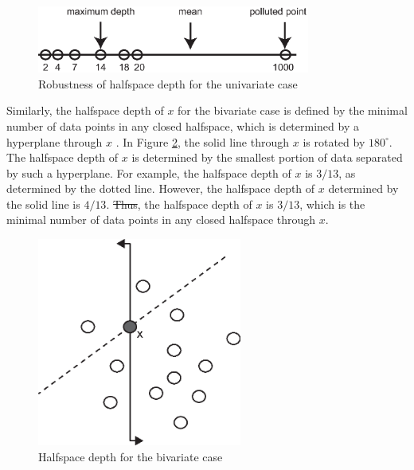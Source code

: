 \documentclass[a4paper,UKenglish]{lipics-v2018}
\providecommand{\DIFadd}[1]{{\protect\color{blue}\uwave{#1}}} %
\providecommand{\DIFdel}[1]{{\protect\color{red}\sout{#1}}}                      %
\providecommand{\DIFaddbegin}{} %
\providecommand{\DIFaddend}{} %
\providecommand{\DIFdelbegin}{} %
\providecommand{\DIFdelend}{} %
\begin{document}
\begin{figure}
	\centering
	\includegraphics[width=0.8\textwidth]{images/depth_uni.eps}
	\caption{Robustness of halfspace depth for the univariate case}
	\label{fig:hd_uni}	
\end{figure}

Similarly, the halfspace depth of $x$ for the bivariate case is defined by the minimal number of data points in any closed halfspace, which is determined by a hyperplane through $x$ \cite{rousseeuw96RSS}.
In Figure \ref{fig:hd_bi}, the solid line through $x$ is rotated by $180^{\circ}$.
The halfspace depth of $x$ is determined by the smallest portion of data separated by such a hyperplane. For example, the halfspace depth of $x$ is $3/13$, as determined by the dotted line.
However, the halfspace depth of $x$ determined by the solid line is  $4/13$.
\DIFdelbegin \DIFdel{Thus}\DIFdelend \DIFaddbegin \DIFadd{Therefore}\DIFaddend , the halfspace depth of $x$ is $3/13$, which is the minimal number of data points in any closed halfspace through $x$.

\begin{figure}
	\centering
	\includegraphics[width=0.6\textwidth]{images/depth_bi.eps}
	\caption{Halfspace depth for the bivariate case}
	\label{fig:hd_bi}	
\end{figure}
\end{document}
